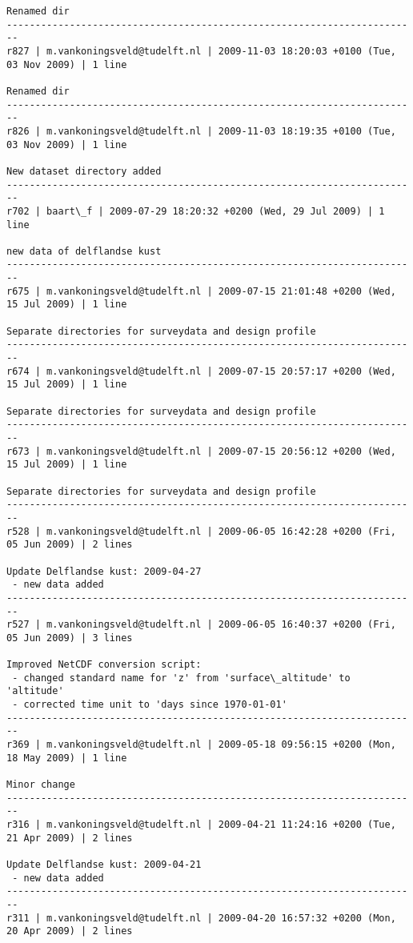 \documentclass[9]{report}
\begin{document}
\begin{description}
\begin{verbatim}
Renamed dir 
------------------------------------------------------------------------
r827 | m.vankoningsveld@tudelft.nl | 2009-11-03 18:20:03 +0100 (Tue, 03 Nov 2009) | 1 line

Renamed dir 
------------------------------------------------------------------------
r826 | m.vankoningsveld@tudelft.nl | 2009-11-03 18:19:35 +0100 (Tue, 03 Nov 2009) | 1 line

New dataset directory added
------------------------------------------------------------------------
r702 | baart\_f | 2009-07-29 18:20:32 +0200 (Wed, 29 Jul 2009) | 1 line

new data of delflandse kust
------------------------------------------------------------------------
r675 | m.vankoningsveld@tudelft.nl | 2009-07-15 21:01:48 +0200 (Wed, 15 Jul 2009) | 1 line

Separate directories for surveydata and design profile
------------------------------------------------------------------------
r674 | m.vankoningsveld@tudelft.nl | 2009-07-15 20:57:17 +0200 (Wed, 15 Jul 2009) | 1 line

Separate directories for surveydata and design profile
------------------------------------------------------------------------
r673 | m.vankoningsveld@tudelft.nl | 2009-07-15 20:56:12 +0200 (Wed, 15 Jul 2009) | 1 line

Separate directories for surveydata and design profile
------------------------------------------------------------------------
r528 | m.vankoningsveld@tudelft.nl | 2009-06-05 16:42:28 +0200 (Fri, 05 Jun 2009) | 2 lines

Update Delflandse kust: 2009-04-27
 - new data added
------------------------------------------------------------------------
r527 | m.vankoningsveld@tudelft.nl | 2009-06-05 16:40:37 +0200 (Fri, 05 Jun 2009) | 3 lines

Improved NetCDF conversion script:
 - changed standard name for 'z' from 'surface\_altitude' to 'altitude'
 - corrected time unit to 'days since 1970-01-01'
------------------------------------------------------------------------
r369 | m.vankoningsveld@tudelft.nl | 2009-05-18 09:56:15 +0200 (Mon, 18 May 2009) | 1 line

Minor change
------------------------------------------------------------------------
r316 | m.vankoningsveld@tudelft.nl | 2009-04-21 11:24:16 +0200 (Tue, 21 Apr 2009) | 2 lines

Update Delflandse kust: 2009-04-21
 - new data added
------------------------------------------------------------------------
r311 | m.vankoningsveld@tudelft.nl | 2009-04-20 16:57:32 +0200 (Mon, 20 Apr 2009) | 2 lines


\end{verbatim}
\end{description}
\end{document}
